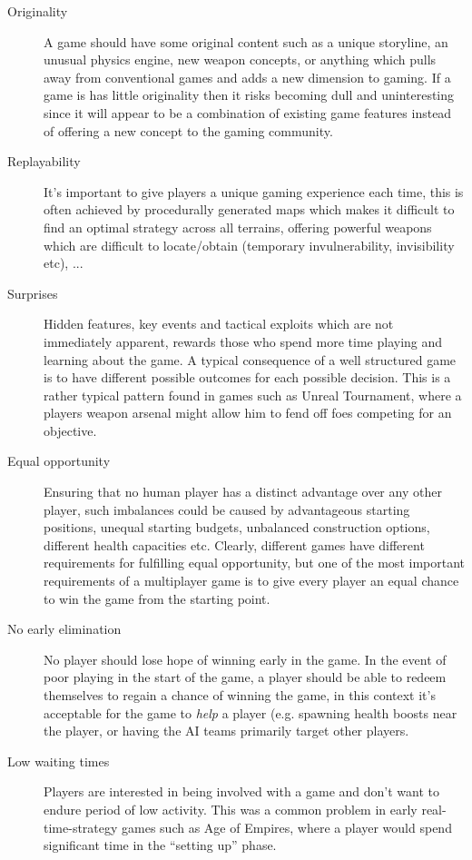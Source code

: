 \begin{description}

\item[Originality] A game should have some original content such as a unique storyline, an unusual physics engine, new weapon concepts, or anything which pulls away from conventional games and adds a new dimension to gaming. If a game is has little originality then it risks becoming dull and uninteresting since it will appear to be a combination of existing game features instead of offering a new concept to the gaming community.

\item[Replayability] It's important to give players a unique gaming experience each time, this is often achieved by procedurally generated maps which makes it difficult to find an optimal strategy across all terrains, offering powerful weapons which are difficult to locate/obtain (temporary invulnerability, invisibility etc), 
...
\item[Surprises] Hidden features, key events and tactical exploits which are not immediately apparent, rewards those who spend more time playing and learning about the game. A typical consequence of a well structured game is to have different possible outcomes for each possible decision. This is a rather typical pattern found in games such as Unreal Tournament, where a players weapon arsenal might allow him to fend off foes competing for an objective.

\item[Equal opportunity]
Ensuring that no human player has a distinct advantage over any other player, such imbalances could be caused by advantageous starting positions, unequal starting budgets, unbalanced construction options, different health capacities etc. Clearly, different games have different requirements for fulfilling equal opportunity, but one of the most important requirements of a multiplayer game is to give every player an equal chance to win the game from the starting point.

\item[No early elimination]
No player should lose hope of winning early in the game. In the event of poor playing in the start of the game, a player should be able to redeem themselves to regain a chance of winning the game, in this context it's acceptable for the game to \emph{help} a player (e.g. spawning health boosts near the player, or having the AI teams primarily target other players.

\item[Low waiting times]
Players are interested in being involved with a game and don't want to endure period of low activity. This was a common problem in early real-time-strategy games such as Age of Empires, where a player would spend significant time in the ``setting up'' phase.

\end{description}



